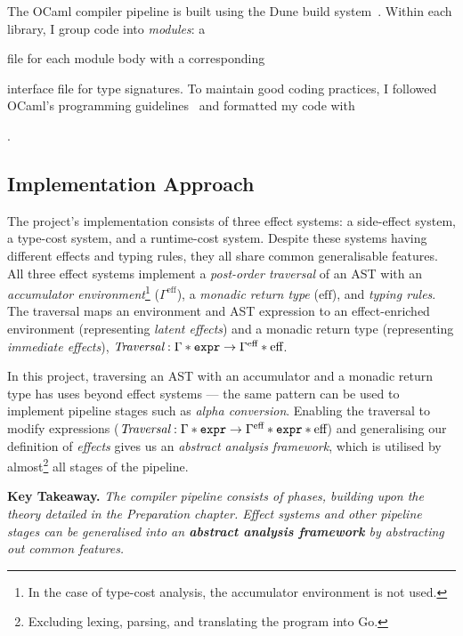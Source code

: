\vspace{-4.5mm}

The OCaml compiler pipeline is built using the Dune build system~\cite{dune}. Within each library, I group code into \textit{modules}: a  file for each module body with a corresponding  interface file for type signatures. To maintain good coding practices, I followed OCaml's programming guidelines~\cite{ocaml} and formatted my code with .

\subsection{Implementation Approach}

\label{sec:3.1.3}

The project's implementation consists of three effect systems: a side-effect system, a type-cost system, and a runtime-cost system. Despite these systems having different effects and typing rules, they all share common generalisable features. All three effect systems implement a \textit{post-order traversal} of an AST with an \textit{accumulator environment}\footnote{In the case of type-cost analysis, the accumulator environment is not used.} (\( \Gamma^\textrm{eff} \)), a \textit{monadic return type} (\( \textrm{eff} \)), and \textit{typing rules}. The traversal maps an environment and AST expression to an effect-enriched environment (representing \textit{latent effects}) and a monadic return type (representing \textit{immediate effects}), \( { \textit{Traversal} : \Gamma * \texttt{expr} \rightarrow \Gamma^\textrm{eff} * \textrm{eff} } \).

In this project, traversing an AST with an accumulator and a monadic return type has uses beyond effect systems --- the same pattern can be used to implement pipeline stages such as \textit{alpha conversion}. Enabling the traversal to modify expressions (\( { \textit{Traversal} : \Gamma * \texttt{expr} \rightarrow \Gamma^\textrm{eff} * \texttt{expr} * \textrm{eff} } \)) and generalising our definition of \textit{effects} gives us an \textit{abstract analysis framework}, which is utilised by almost\footnote{Excluding lexing, parsing, and translating the program into Go.} all stages of the pipeline.

\textbf{Key Takeaway.} \textit{The compiler pipeline consists of phases, building upon the theory detailed in the Preparation chapter. Effect systems and other pipeline stages can be generalised into an \textbf{abstract analysis framework} by abstracting out common features.}

